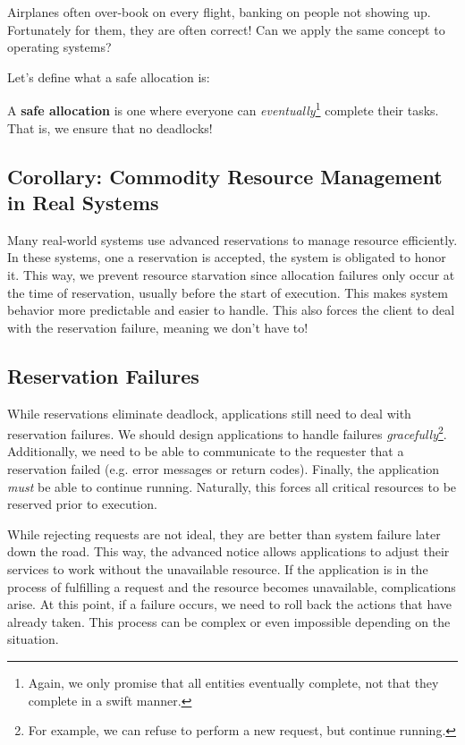 \documentclass{report}
\newcommand{\definitionBegin}[1]{\begin{tcolorbox}[title={Definition: #1}]}
\newcommand{\definitionEnd}{\end{tcolorbox}}
\newcommand{\exampleBegin}[1]{\begin{tcolorbox}[colback=blue!5!white,colframe=black!75!blue,title={Example:
      #1}]}
\newcommand{\exampleEnd}{\end{tcolorbox}}
\begin{document}
\exampleBegin{Fly Fucked}
Airplanes often over-book on every flight, banking on people not showing up. Fortunately for them,
they are often correct! Can we apply the same concept to operating systems?
\exampleEnd

Let's define what a safe allocation is:

\definitionBegin{Safe Allocation}
A \textbf{safe allocation} is one where everyone can \textit{eventually}\footnote{Again, we only
  promise that all entities eventually complete, not that they complete in a swift manner.} complete
their tasks. That is, we ensure that no deadlocks!
\definitionEnd


\subsection*{Corollary: Commodity Resource Management in Real Systems}
Many real-world systems use advanced reservations to manage resource efficiently. In these systems,
one a reservation is accepted, the system is obligated to honor it. This way, we prevent resource
starvation since allocation failures only occur at the time of reservation, usually before the start
of execution. This makes system behavior more predictable and easier to handle. This also forces the
client to deal with the reservation failure, meaning we don't have to!


\subsection{Reservation Failures}
While reservations eliminate deadlock, applications still need to deal with reservation failures. We
should design applications to handle failures \textit{gracefully}\footnote{For example, we can
  refuse to perform a new request, but continue running.}. Additionally, we need to be able to
communicate to the requester that a reservation failed (e.g. error messages or return
codes). Finally, the application \textit{must} be able to continue running. Naturally, this forces
all critical resources to be reserved prior to execution.

While rejecting requests are not ideal, they are better than system failure later down the
road. This way, the advanced notice allows applications to adjust their services to work without the
unavailable resource. If the application is in the process of fulfilling a request and the resource
becomes unavailable, complications arise. At this point, if a failure occurs, we need to roll back
the actions that have already taken. This process can be complex or even impossible depending on the
situation.
\end{document}
